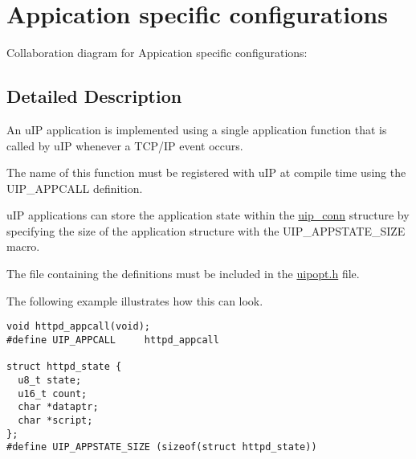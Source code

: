 \hypertarget{a00078}{
\section{Appication specific configurations}
\label{a00078}
}


Collaboration diagram for Appication specific configurations:

\subsection{Detailed Description}
An u\-IP application is implemented using a single application function that is called by u\-IP whenever a TCP/IP event occurs. 

The name of this function must be registered with u\-IP at compile time using the UIP\_\-APPCALL definition.

u\-IP applications can store the application state within the \hyperlink{a00028}{uip\_\-conn} structure by specifying the size of the application structure with the UIP\_\-APPSTATE\_\-SIZE macro.

The file containing the definitions must be included in the \hyperlink{a00058}{uipopt.h} file.

The following example illustrates how this can look. 

\footnotesize\begin{verbatim}void httpd_appcall(void);
#define UIP_APPCALL     httpd_appcall

struct httpd_state {
  u8_t state; 
  u16_t count;
  char *dataptr;
  char *script;
};
#define UIP_APPSTATE_SIZE (sizeof(struct httpd_state))
\end{verbatim}
\normalsize
 

